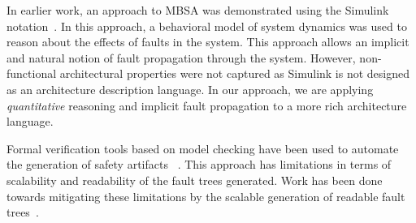 In earlier work, an approach to MBSA was demonstrated using the Simulink notation~\cite{Joshi05:SafeComp,Joshi05:Dasc}. In this approach, a behavioral model of system dynamics was used to reason about the effects of faults in the system. This approach allows an implicit and natural notion of fault propagation through the system. However, non-functional architectural properties were not captured as Simulink is not designed as an architecture description language. In our approach, we are applying \textit{quantitative} reasoning and implicit fault propagation to a more rich architecture language. 

Formal verification tools based on model checking have been used to automate the generation of safety artifacts%
~\cite{symbAltaRica,10.1007/978-3-540-75596-8-13, DBLP:conf/tacas/BittnerBCCGGMMZ16}. This approach has limitations in terms of scalability and readability of the fault trees generated. Work has been done towards mitigating these limitations by the scalable generation of readable fault trees~\cite{10.1007/978-3-319-11936-6-7}. 


